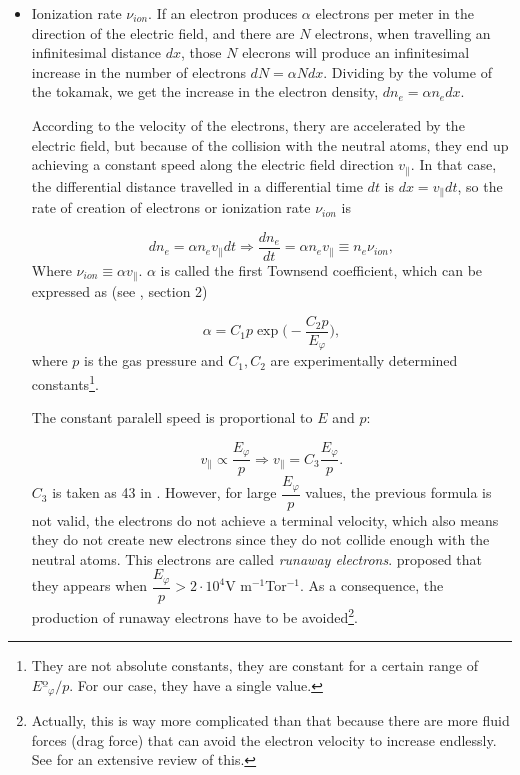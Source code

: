\documentclass[a4paper,12pt,oneside]{book}
\begin{document}
\begin{itemize}

	\item Ionization rate $\nu_{ion}$. If an electron produces $\alpha$ electrons per meter in the direction of the electric field, and there are $N$ electrons, when travelling an infinitesimal distance $dx$, those $N$ elecrons will produce an infinitesimal increase in the number of electrons $dN=\alpha N dx$. Dividing by the volume of the tokamak, we get the increase in the electron density, $dn_e=\alpha n_e dx$. 

According to the velocity of the electrons, thery are accelerated by the electric field, but because of the collision with the neutral atoms, they end up achieving a constant speed along the electric field direction $v_{\parallel}$. In that case, the differential distance travelled in a differential time $dt$ is $dx=v_{\parallel} dt$, so the rate of creation of electrons or ionization rate $\nu_{ion}$ is 

	\begin{equation}\label{nu ion}
dn_e=\alpha n_e v_{\parallel} dt \Rightarrow \dfrac{dn_e}{dt}=\alpha n_e v_{\parallel} \equiv n_e \nu_{ion},
	\end{equation}
Where $\nu_{ion} \equiv \alpha v_{\parallel}$. $\alpha$ is called the first Townsend coefficient, which can be expressed as (see \cite{KimThesis}, section 2)

	\begin{equation}\label{def alfa}
\alpha = C_1 p \exp \Big(-\dfrac{C_2 p}{E_\varphi} \Big),
	\end{equation}
where $p$ is the gas pressure and $C_1,C_2$ are experimentally determined constants\footnote{They are not absolute constants, they are constant for a certain range of $Eº_\varphi/p$. For our case, they have a single value.}. 

The constant paralell speed is proportional to $E$ and $p$:

\begin{equation}
v_\parallel \propto \dfrac{E_\varphi}{p} \Rightarrow v_\parallel = C_3 \dfrac{E_\varphi}{p}.
\end{equation}
$C_3$ is taken as 43 in \cite{Lloyd_1991}. However, for large $\dfrac{E_\varphi}{p}$ values, the previous formula is not valid, the electrons do not achieve a terminal velocity, which also means they do not create new electrons since they do not collide enough with the neutral atoms. This electrons are called \textit{runaway electrons}. \cite{Lloyd_1991} proposed that they appears when $\dfrac{E_\varphi}{p}>2 \cdot 10^4 $V m$^{-1}$Tor$^{-1}$. As a consequence, the production of runaway electrons have to be avoided\footnote{Actually, this is way more complicated than that because there are more fluid forces (drag force) that can avoid the electron velocity to increase endlessly. See \cite{ITER_2019} for an extensive review of this.}.


\end{itemize}
\end{document}
